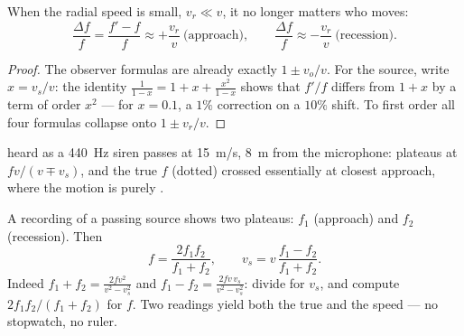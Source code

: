 \begin{proposition}\label{prop:g12:doppler-effect:slow}
When the radial speed is small, $v_r \ll v$, it no longer matters who moves:
\[
\frac{\Delta f}{f} = \frac{f' - f}{f} \approx +\frac{v_r}{v} \ \text{(approach)},
\qquad
\frac{\Delta f}{f} \approx -\frac{v_r}{v} \ \text{(recession)}.
\]
\end{proposition}

\begin{proof}
The observer formulas are already exactly $1 \pm v_o/v$. For the source, write $x = v_s/v$:
the identity $\frac{1}{1 - x} = 1 + x + \frac{x^2}{1 - x}$ shows that $f'/f$ differs from
$1 + x$ by a term of order $x^2$ --- for $x = 0.1$, a $1\%$ correction on a $10\%$ shift.
To first order all four formulas collapse onto $1 \pm v_r/v$.
\end{proof}

\begin{omfigure}

{\small {} heard as a \qty{440}{Hz} siren passes at \qty{15}{m/s}, \qty{8}{m}
from the microphone: plateaus at $fv/(v \mp v_s)$, and the true $f$ (dotted) crossed
essentially at closest approach, where the motion is purely .}
\end{omfigure}

\begin{method}\label{met:g12:doppler-effect:pass}
A recording of a passing source shows two plateaus: $f_1$ (approach) and $f_2$
(recession). Then
\[
f = \frac{2 f_1 f_2}{f_1 + f_2}, \qquad
v_s = v\,\frac{f_1 - f_2}{f_1 + f_2}.
\]
Indeed $f_1 + f_2 = \frac{2fv^2}{v^2 - v_s^2}$ and $f_1 - f_2 = \frac{2fv\,v_s}{v^2 - v_s^2}$:
divide for $v_s$, and compute $2f_1 f_2/(f_1 + f_2)$ for $f$. Two  readings yield
both the true  and the speed --- no stopwatch, no ruler.
\end{method}

